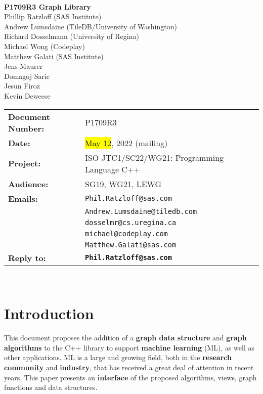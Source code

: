 \documentclass[10pt,onecolumn]{article}
\begin{document}
\begin{titlepage}
~
\vfill
\begin{center}
\LARGE
\textbf{P1709R3 Graph Library}\\
\vspace{12pt}
\normalsize
	Phillip Ratzloff (SAS Institute)\\
	Andrew Lumsdaine (TileDB/University of Washington)\\
	Richard Dosselmann (University of Regina)\\
	Michael Wong (Codeplay)\\
	Matthew Galati (SAS Institute)\\	
	Jens Maurer\\
	Domagoj Saric\\
	Jesun Firoz\\
	Kevin Deweese\\
\end{center}
\vspace{32pt}
\begin{tabular}{ll}
\textbf{Document Number:} & P1709R3\\
\textbf{Date:} & \hl{May 12}, 2022 (mailing)\\ 
\textbf{Project:} & ISO JTC1/SC22/WG21: Programming Language C++\\
\textbf{Audience:} & SG19, WG21, LEWG\\
\textbf{Emails:}
	&\texttt{Phil.Ratzloff@sas.com}\\
	&\texttt{Andrew.Lumsdaine@tiledb.com}\\
	&\texttt{dosselmr@cs.uregina.ca}\\
	&\texttt{michael@codeplay.com}\\
	&\texttt{Matthew.Galati@sas.com}\\
\textbf{Reply to:}
	&\texttt{\textbf{Phil.Ratzloff@sas.com}}\\
\end{tabular}
\vfill
~
\end{titlepage}

\tableofcontents

\clearpage

\section{Introduction}
This document proposes the addition of a \textbf{graph data structure} and \textbf{graph algorithms} to the C++ library to support \textbf{machine learning} (ML), as well as other applications. ML is a large and growing field, both in the \textbf{research community} and \textbf{industry}, that has received a great deal of attention in recent years. This paper presents an \textbf{interface} of the proposed algorithms, views, graph functions and data structures.
\end{document}
